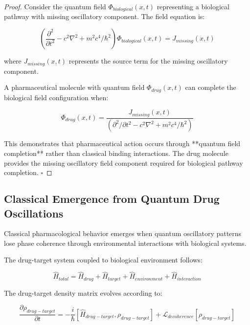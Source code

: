 \documentclass[12pt,a4paper]{article}
\begin{document}
\begin{proof}
Consider the quantum field $\Phi_{biological}(x,t)$ representing a biological pathway with missing oscillatory component. The field equation is:

\begin{equation}
\left(\frac{\partial^2}{\partial t^2} - c^2\nabla^2 + m^2c^4/\hbar^2\right)\Phi_{biological}(x,t) = J_{missing}(x,t)
\end{equation}

where $J_{missing}(x,t)$ represents the source term for the missing oscillatory component.

A pharmaceutical molecule with quantum field $\Phi_{drug}(x,t)$ can complete the biological field configuration when:

\begin{equation}
\Phi_{drug}(x,t) = \frac{J_{missing}(x,t)}{(\partial^2/\partial t^2 - c^2\nabla^2 + m^2c^4/\hbar^2)}
\end{equation}

This demonstrates that pharmaceutical action occurs through **quantum field completion** rather than classical binding interactions. The drug molecule provides the missing oscillatory field component required for biological pathway completion. $\square$
\end{proof}

\subsection{Classical Emergence from Quantum Drug Oscillations}

Classical pharmacological behavior emerges when quantum oscillatory patterns lose phase coherence through environmental interactions with biological systems.

The drug-target system coupled to biological environment follows:

\begin{equation}
\hat{H}_{total} = \hat{H}_{drug} + \hat{H}_{target} + \hat{H}_{environment} + \hat{H}_{interaction}
\end{equation}

The drug-target density matrix evolves according to:

\begin{equation}
\frac{\partial \rho_{drug-target}}{\partial t} = -\frac{i}{\hbar}[\hat{H}_{drug-target}, \rho_{drug-target}] + \mathcal{L}_{decoherence}[\rho_{drug-target}]
\end{equation}
\end{document}
